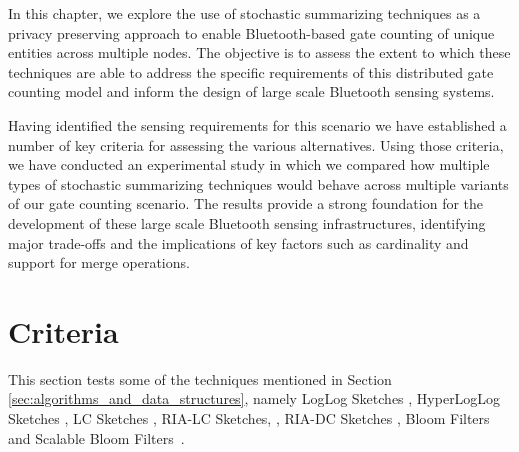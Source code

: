 In this chapter, we explore the use of stochastic summarizing
techniques as a privacy preserving approach to enable Bluetooth-based
gate counting of unique entities across multiple nodes. The objective
is to assess the extent to which these techniques are able to address the
specific requirements of this distributed gate counting model and
inform the design of large scale Bluetooth sensing systems.

Having identified the sensing requirements for this scenario we have
established a number of key criteria for assessing the various
alternatives. Using those criteria, we have conducted an
experimental study in which we compared how multiple types of
stochastic summarizing techniques would behave across multiple
variants of our gate counting scenario. The results provide a strong
foundation for the development of these large scale Bluetooth sensing
infrastructures, identifying major trade-offs and the implications of
key factors such as cardinality and support for merge operations.




\section{Criteria}
\label{sec:Criteria}

This section tests some of the techniques mentioned in Section
\ref{sec:algorithms_and_data_structures}, namely LogLog Sketches
\cite{Durand:2003tc}, HyperLogLog Sketches \cite{Fusy:2007um}, LC
Sketches \cite{Whang:1990uh}, RIA-LC Sketches,
\cite{Fan:2008wl,YaoChungFanArbeeLPChen:2010to}, RIA-DC Sketches
\cite{YaoChungFanArbeeLPChen:2010to}, Bloom Filters~\cite{Bloom1970}
and Scalable Bloom Filters~\cite{Almeida2007}.

